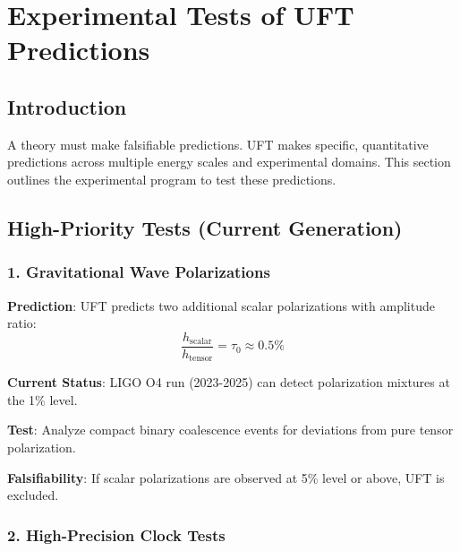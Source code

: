 \section{Experimental Tests of UFT Predictions}
\label{sec:experimental_tests}

\subsection{Introduction}

A theory must make falsifiable predictions. UFT makes specific, quantitative predictions across multiple energy scales and experimental domains. This section outlines the experimental program to test these predictions.

\subsection{High-Priority Tests (Current Generation)}

\subsubsection{1. Gravitational Wave Polarizations}

\begin{test}
\textbf{Prediction}: UFT predicts two additional scalar polarizations with amplitude ratio:
\begin{equation}
    \frac{h_{\text{scalar}}}{h_{\text{tensor}}} = \tau_0 \approx 0.5\%
\end{equation}

\textbf{Current Status}: LIGO O4 run (2023-2025) can detect polarization mixtures at the 1\% level.

\textbf{Test}: Analyze compact binary coalescence events for deviations from pure tensor polarization.

\textbf{Falsifiability}: If scalar polarizations are observed at 5\% level or above, UFT is excluded.
\end{test}

\subsubsection{2. High-Precision Clock Tests}

